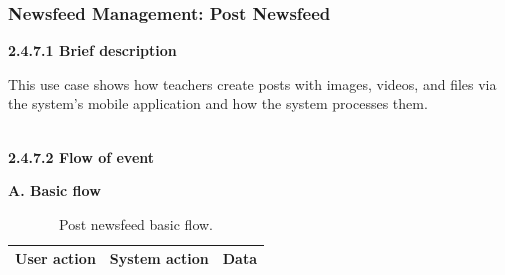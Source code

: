 \subsubsection{Newsfeed Management: Post Newsfeed}
\indent\indent\textbf{2.4.7.1 Brief description}
\vspace{0.5em}
\par\indent\indent\parbox{0.9\textwidth}{
   This use case shows how teachers create posts with images, videos, and files via the system's mobile application and how the system processes them.
}\\
\newpage
\indent\textbf{2.4.7.2 Flow of event}
\vspace{0.5em}
\par\indent\indent\textbf{A. Basic flow}
\vspace{-0.5em}
\renewcommand{\arraystretch}{1.5}
\begin{longtable}{|>{\raggedright\arraybackslash}p{4.5cm}|
                  >{\raggedright\arraybackslash}p{6cm}|
                  >{\raggedright\arraybackslash}p{4.5cm}|}                  
\caption{Post newsfeed basic flow.}
\label{tab:newsfeed_management_post_newsfeed_basic_flow}\\
\hline
\centering\textbf{User action} & \centering\textbf{System action} & \centering\arraybackslash\textbf{Data} \\
\hline
\endfirsthead
\endhead


\end{longtable}
